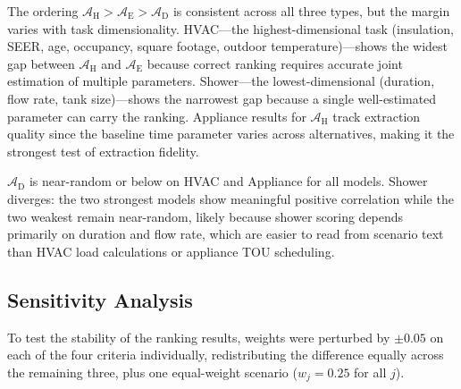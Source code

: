\documentclass[final,3p,times]{elsarticle}
\begin{document}
The ordering $\mathcal{A}_{\text{H}} > \mathcal{A}_{\text{E}} > \mathcal{A}_{\text{D}}$ is consistent across all three types, but the margin varies with task dimensionality. HVAC---the highest-dimensional task (insulation, SEER, age, occupancy, square footage, outdoor temperature)---shows the widest gap between $\mathcal{A}_{\text{H}}$ and $\mathcal{A}_{\text{E}}$ because correct ranking requires accurate joint estimation of multiple parameters. Shower---the lowest-dimensional (duration, flow rate, tank size)---shows the narrowest gap because a single well-estimated parameter can carry the ranking. Appliance results for $\mathcal{A}_{\text{H}}$ track extraction quality since the baseline time parameter varies across alternatives, making it the strongest test of extraction fidelity.

$\mathcal{A}_{\text{D}}$ is near-random or below on HVAC and Appliance for all models. Shower diverges: the two strongest models show meaningful positive correlation while the two weakest remain near-random, likely because shower scoring depends primarily on duration and flow rate, which are easier to read from scenario text than HVAC load calculations or appliance TOU scheduling.

\FloatBarrier
\subsection{Sensitivity Analysis}
\label{sec:res-sensitivity}

To test the stability of the ranking results, weights were perturbed by $\pm 0.05$ on each of the four criteria individually, redistributing the difference equally across the remaining three, plus one equal-weight scenario ($w_j = 0.25$ for all $j$).
\end{document}
